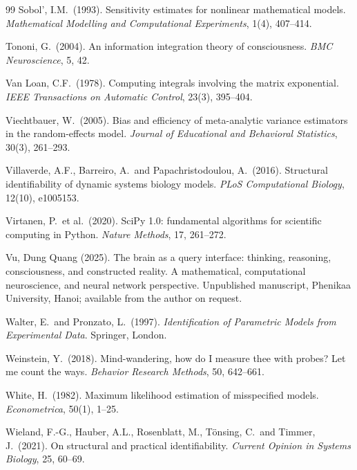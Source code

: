 \documentclass[12pt,a4paper]{article}
\theoremstyle{plain}
\theoremstyle{definition}
\theoremstyle{remark}
\begin{document}
\begin{thebibliography}{99}
Sobol', I.M.\ (1993).
Sensitivity estimates for nonlinear mathematical models.
\textit{Mathematical Modelling and Computational Experiments}, 1(4), 407--414.

Tononi, G.\ (2004).
An information integration theory of consciousness.
\textit{BMC Neuroscience}, 5, 42.

Van Loan, C.F.\ (1978).
Computing integrals involving the matrix exponential.
\textit{IEEE Transactions on Automatic Control}, 23(3), 395--404.

Viechtbauer, W.\ (2005).
Bias and efficiency of meta-analytic variance estimators in the random-effects model.
\textit{Journal of Educational and Behavioral Statistics}, 30(3), 261--293.

Villaverde, A.F., Barreiro, A.\ and Papachristodoulou, A.\ (2016).
Structural identifiability of dynamic systems biology models.
\textit{PLoS Computational Biology}, 12(10), e1005153.

Virtanen, P.\ et al.\ (2020).
SciPy 1.0: fundamental algorithms for scientific computing in Python.
\textit{Nature Methods}, 17, 261--272.

{\color{red}Vu, Dung Quang (2025).
The brain as a query interface: thinking, reasoning, consciousness, and constructed reality. A mathematical, computational neuroscience, and neural network perspective.
Unpublished manuscript, Phenikaa University, Hanoi; available from the author on request.} %

Walter, E.\ and Pronzato, L.\ (1997).
\textit{Identification of Parametric Models from Experimental Data}. Springer, London.

Weinstein, Y.\ (2018).
Mind-wandering, how do I measure thee with probes? Let me count the ways.
\textit{Behavior Research Methods}, 50, 642--661.

White, H.\ (1982).
Maximum likelihood estimation of misspecified models.
\textit{Econometrica}, 50(1), 1--25.

Wieland, F.-G., Hauber, A.L., Rosenblatt, M., T\"onsing, C.\ and Timmer, J.\ (2021).
On structural and practical identifiability.
\textit{Current Opinion in Systems Biology}, 25, 60--69.

\end{thebibliography}
\end{document}
